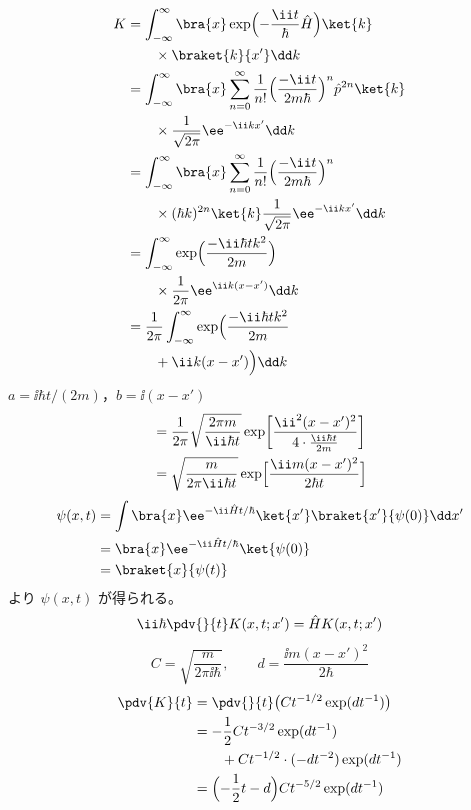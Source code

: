 \begin{align*}
K&=\int_{-\infty}^{\infty}\bra{x}\exp\Bigl(-\frac{\ii t}{\hbar}\hat{H}\Bigr)\ket{k}\\
&\qquad\times\braket{k}{x'}\dd k\\
&=\int_{-\infty}^{\infty}\bra{x}\sum_{n=0}^{\infty}\frac{1}{n!}\Bigl(\frac{-\ii t}{2m\hbar}\Bigr)^{n}\hat{p}^{2n}\ket{k}\\
&\qquad\times\frac{1}{\sqrt{2\pi}}\ee^{-\ii kx'}\dd k\\
&=\int_{-\infty}^{\infty}\bra{x}\sum_{n=0}^{\infty}\frac{1}{n!}\Bigl(\frac{-\ii t}{2m\hbar}\Bigr)^{n}\\
&\qquad\times(\hbar k)^{2n}\ket{k}\frac{1}{\sqrt{2\pi}}\ee^{-\ii kx'}\dd k\\
&=\int_{-\infty}^{\infty}\exp\Bigl(\frac{-\ii\hbar tk^{2}}{2m}\Bigr)\\
&\qquad\times\frac{1}{2\pi}\ee^{\ii k(x-x')}\dd k\\
&=\frac{1}{2\pi}\int_{-\infty}^{\infty}\exp\Bigl(\frac{-\ii\hbar tk^{2}}{2m}\\
&\qquad+\ii k(x-x')\Bigr)\dd k
\end{align*}
$a=\ii\hbar t/(2m)$，$b=\ii(x-x')$
\begin{align*}
&=\frac{1}{2\pi}\sqrt{\frac{2\pi m}{\ii\hbar t}}\exp\biggl[\frac{\ii^{2}(x-x')^{2}}{4\cdot\frac{\ii\hbar t}{2m}}\biggr]\\
&=\sqrt{\frac{m}{2\pi\ii\hbar t}}\exp\Bigl[\frac{\ii m(x-x')^{2}}{2\hbar t}\Bigr]
\end{align*}
\begin{align*}
\psi(x,t)&=\int\bra{x}\ee^{-\ii\hat{H}t/\hbar}\ket{x'}\braket{x'}{\psi(0)}\dd x'\\
&=\bra{x}\ee^{-\ii\hat{H}t/\hbar}\ket{\psi(0)}\\
&=\braket{x}{\psi(t)}
\end{align*}
より $\psi(x,t)$ が得られる。
\[ \ii\hbar\pdv{}{t}K(x,t;x')=\hat{H}K(x,t;x') \]
\[ C=\sqrt{\frac{m}{2\pi\ii\hbar}},\qquad d=\frac{\ii m(x-x')^{2}}{2\hbar} \]
\begin{align*}
\pdv{K}{t}&=\pdv{}{t}\bigl(Ct^{-1/2}\exp(dt^{-1})\bigr)\\
&=-\frac{1}{2}Ct^{-3/2}\exp(dt^{-1})\\
&\qquad+Ct^{-1/2}\cdot(-dt^{-2})\exp(dt^{-1})\\
&=\Bigl(-\frac{1}{2}t-d\Bigr)Ct^{-5/2}\exp(dt^{-1})
\end{align*}

